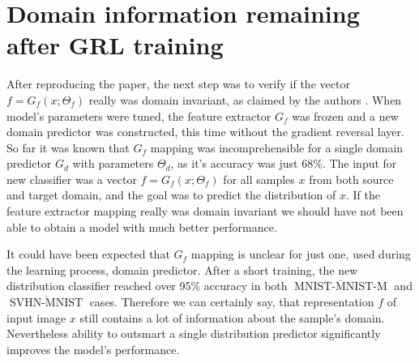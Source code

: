 \documentclass[shortabstract, inz, english]{iithesis}
\DeclareMathOperator{\mnistM}{MNIST-MNIST-M}
\DeclareMathOperator{\svhnM}{SVHN-MNIST}
\newcommand{\mnist}{$\overline{\mnistM}$ }
\newcommand{\svhn}{$\overline{\svhnM}$ }
\begin{document}
\section{Domain information remaining after GRL training}
After reproducing the paper, the next step was to verify if the vector $f=G_{f}(x;\Theta_{f})$ really was domain invariant, as claimed by the authors \cite{pmlr-v37-ganin15}. When model's parameters were tuned, the feature extractor $G_{f}$ was frozen and a new domain predictor was constructed, this time without the gradient reversal layer. So far it was known that $G_{f}$ mapping was incomprehensible for a single domain predictor $G_{d}$ with parameters $\Theta_{d}$, as it's accuracy was just 68\%. The input for new classifier was a vector $f = G_{f}(x;\Theta_{f})$ for all samples $x$ from both source and target domain, and the goal was to predict the distribution of $x$. If the feature extractor mapping really was domain invariant we should have not been able to obtain a model with much better performance.
\par
It could have been expected that $G_{f}$ mapping is unclear for just one, used during the learning process, domain predictor. After a short training, the new distribution classifier reached over 95\% accuracy in both \mnist and \svhn cases. Therefore we can certainly say, that representation $f$ of input image $x$ still contains a lot of information about the sample's domain. Nevertheless ability to outsmart a single distribution predictor significantly improves the model's performance.
\end{document}
